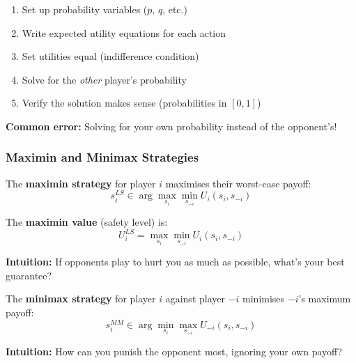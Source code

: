 \begin{tipbox}
\begin{enumerate}
  \item Set up probability variables ($p$, $q$, etc.)
  \item Write expected utility equations for each action
  \item Set utilities equal (indifference condition)
  \item Solve for the \textit{other} player's probability
  \item Verify the solution makes sense (probabilities in $[0,1]$)
\end{enumerate}

\textbf{Common error:} Solving for your own probability instead of the opponent's!
\end{tipbox}

\bigseparator

\subsubsection{Maximin and Minimax Strategies}

\begin{defbox}
The \textbf{maximin strategy} for player $i$ maximises their worst-case payoff:
\[
s_i^{LS} \in \arg\max_{s_i} \min_{s_{-i}} U_i(s_i, s_{-i})
\]

The \textbf{maximin value} (safety level) is:
\[
U_i^{LS} = \max_{s_i} \min_{s_{-i}} U_i(s_i, s_{-i})
\]

\textbf{Intuition:} If opponents play to hurt you as much as possible, what's your best guarantee?
\end{defbox}

\begin{defbox}
The \textbf{minimax strategy} for player $i$ against player $-i$ minimises $-i$'s maximum payoff:
\[
s_i^{MM} \in \arg\min_{s_i} \max_{s_{-i}} U_{-i}(s_i, s_{-i})
\]

\textbf{Intuition:} How can you punish the opponent most, ignoring your own payoff?
\end{defbox}

